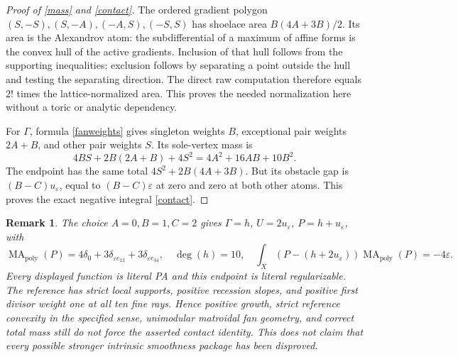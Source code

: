 \documentclass[11pt]{article}
\newtheorem{remark}[theorem]{Remark}
\newcommand{\MA}{\operatorname{MA}_{\mathrm{poly}}}
\newcommand{\eps}{\varepsilon}
\begin{document}
\begin{proof}[Proof of \eqref{mass} and \eqref{contact}]
The ordered gradient polygon $(S,-S),(S,-A),(-A,S),(-S,S)$ has shoelace area $B(4A+3B)/2$. Its area is the Alexandrov atom: the subdifferential of a maximum of affine forms is the convex hull of the active gradients. Inclusion of that hull follows from the supporting inequalities; exclusion follows by separating a point outside the hull and testing the separating direction. The direct raw computation therefore equals $2!$ times the lattice-normalized area. This proves the needed normalization here without a toric or analytic dependency.

For $\Gamma$, formula \eqref{fanweights} gives singleton weights $B$, exceptional pair weights $2A+B$, and other pair weights $S$. Its sole-vertex mass is
\[4BS+2B(2A+B)+4S^2=4A^2+16AB+10B^2.\]
The endpoint has the same total $4S^2+2B(4A+3B)$. But its obstacle gap is $(B-C)u_\eps$, equal to $(B-C)\eps$ at zero and zero at both other atoms. This proves the exact negative integral \eqref{contact}.
\end{proof}

\begin{remark}\label{simplest}
The choice $A=0,B=1,C=2$ gives $\Gamma=h$, $U=2u_\eps$, $P=h+u_\eps$, with
\[\MA(P)=4\delta_0+3\delta_{\eps e_{12}}+3\delta_{\eps e_{34}},\quad\deg(h)=10,\quad\int_X(P-(h+2u_\eps))\MA(P)=-4\eps.\]
Every displayed function is literal PA and this endpoint is literal regularizable. The reference has strict local supports, positive recession slopes, and positive first divisor weight one at all ten fine rays. Hence positive growth, strict reference convexity in the specified sense, unimodular matroidal fan geometry, and correct total mass still do not force the asserted contact identity. This does not claim that every possible stronger intrinsic smoothness package has been disproved.
\end{remark}
\end{document}
